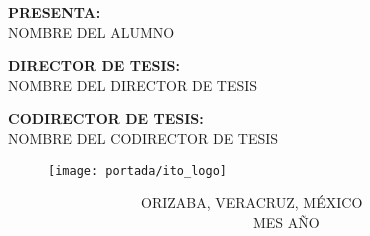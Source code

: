 \begin{titlepage}
\begin{minipage}{20cm}
        \vspace{0.5\baselineskip}
        \begin{center}
            \fontsize{11}{12}\selectfont \textbf{PRESENTA:} \\
            \fontsize{12}{12}\selectfont NOMBRE DEL ALUMNO
        \end{center}

        \vspace{1\baselineskip}
        \begin{center}
            \fontsize{11}{12}\selectfont \textbf{DIRECTOR DE TESIS:} \\
            \fontsize{12}{12}\selectfont NOMBRE DEL DIRECTOR DE TESIS
        \end{center}

        \vspace{1\baselineskip}
        \begin{center}
            \fontsize{11}{12}\selectfont \textbf{CODIRECTOR DE TESIS:} \\
            \fontsize{12}{12}\selectfont NOMBRE DEL CODIRECTOR DE TESIS
        \end{center}

        \begin{figure}[H]
            \texttt{[image: portada/ito\_logo]}
        \end{figure}

        \vspace{1\baselineskip}
        \begin{flushleft}
            \fontsize{11}{12}\selectfont \ \ \ \ \ \ \ \ \ \ \ \ \ \ \ \ \ \ \ ORIZABA, VERACRUZ, MÉXICO \ \ \ \ \ \ \ \ \ \ \ \ \ \ \ \ \ \ \ \ \ \ \ \ \ \ \ \ \ \ \ \ \ \ \ MES AÑO
        \end{flushleft}
    \end{minipage}
\end{titlepage}
